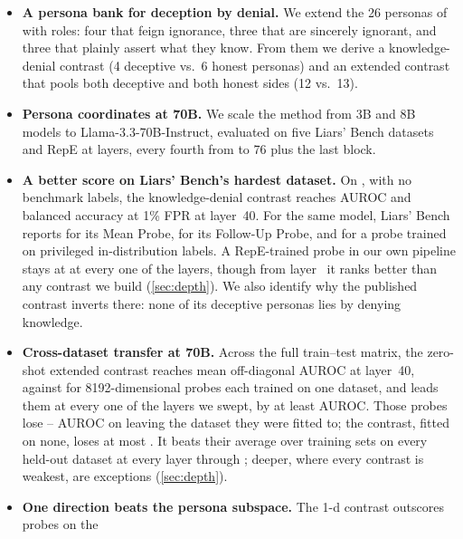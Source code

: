 \begin{itemize}[leftmargin=1.2em, itemsep=2pt, topsep=3pt]
\item \textbf{A persona bank for deception by denial.} We extend the 26 personas of
  \citet{mahadik2026persona} with  roles: four that feign ignorance, three that are
  sincerely ignorant, and three that plainly assert what they know. From them we derive a
  knowledge-denial contrast (4 deceptive vs.\ 6 honest personas) and an extended contrast that
  pools both deceptive and both honest sides (12 vs.\ 13).
\item \textbf{Persona coordinates at 70B.} We scale the method from 3B and 8B models to
  Llama-3.3-70B-Instruct, evaluated on five Liars' Bench datasets and RepE at  layers,
  every fourth from  to 76 plus the last block.
\item \textbf{A better score on Liars' Bench's hardest dataset.} On \hpkr, with no benchmark
  labels, the knowledge-denial contrast reaches  AUROC and
   balanced accuracy at 1\% FPR at layer~40. For the same model, Liars'
  Bench reports  for its Mean Probe,  for its
  Follow-Up Probe, and  for a probe trained on privileged in-distribution
  labels. A RepE-trained probe in our own pipeline stays at  at every one of the
   layers, though from layer~ it ranks \hpkr{}
  better than any contrast we build (\cref{sec:depth}).
  We also identify why the published contrast inverts there: none of its deceptive personas lies
  by denying knowledge.
\item \textbf{Cross-dataset transfer at 70B.} Across the full train--test matrix, the zero-shot
  extended contrast reaches  mean off-diagonal AUROC at layer~40, against
   for 8192-dimensional probes each trained on one dataset, and leads them at every
  one of the  layers we swept, by at least  AUROC. Those
  probes lose -- AUROC on leaving the dataset they
  were fitted to; the contrast, fitted on none, loses at most . It beats their average
  over training sets on every held-out dataset at every layer through
  ; deeper, where every contrast is weakest,
   are exceptions (\cref{sec:depth}).
\item \textbf{One direction beats the persona subspace.} The 1-d contrast outscores probes on the

\end{itemize}
